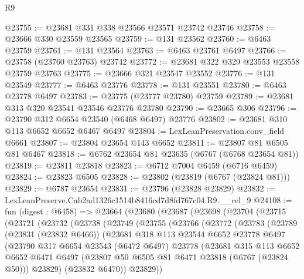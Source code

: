 \begin{lexlean}{R9}
\begin{coremodule}
@23755 := @23681 @331 @338 @23566 @23571 @23742 @23746
@23758 := @23666 @330 @23559 @23565
@23759 := @131 @23562
@23760 := @6463 @23759
@23761 := @131 @23564
@23763 := @6463 @23761 @6497
@23766 := @23758 (@23760 @23763) @23742
@23772 := @23681 @322 @329 @23553 @23558 @23759 @23763
@23775 := @23666 @321 @23547 @23552
@23776 := @131 @23549
@23777 := @6463 @23776
@23778 := @131 @23551
@23780 := @6463 @23778 @6497
@23783 := @23775 (@23777 @23780) @23759
@23789 := @23681 @313 @320 @23541 @23546 @23776 @23780
@23790 := @23665 @306
@23796 := @23790 @312 @6654 @23540 (@6468 @6497) @23776
@23802 := @23681 @310 @113 @6652 @6652 @6467 @6497
@23804 := LexLeanPreservation.conv_field @6661
@23807 := @23804 @23654 @143 @6652
@23811 := @23807 @81 @6505 @81 @6467
@23818 := @6762 @23654 @81 @23635 (@6767 (@6768 @23654 @81))
@23819 := @23811 @23818
@23823 := @6712 @7004 @6459 (@6716 @6459)
@23824 := @23823 @6505
@23828 := @23802 (@23819 (@6767 (@23824 @81)))
@23829 := @6787 @23654
@23831 := @23796 (@23828 @23829)
@23832 := LexLeanPreserve.Cab2ad1326c1514b8416cd7d8fd767c04.R9.__rel_9
@24108 := fun (digest : @6458) =>
  @23664
    (@23680
      (@23687
        (@23698
          (@23704
            (@23715
              (@23721
                (@23732
                  (@23738
                    (@23749
                      (@23755
                        (@23766
                          (@23772
                            (@23783
                              (@23789
                                (@23831 (@23832 @6466))
                                (@23681
                                  @318
                                  @113
                                  @23544
                                  @6652
                                  @23778
                                  @6497
                                  (@23790
                                    @317
                                    @6654
                                    @23543
                                    (@6472 @6497)
                                    @23778
                                    (@23681
                                      @315
                                      @113
                                      @6652
                                      @6652
                                      @6471
                                      @6497
                                      (@23807 @50 @6505 @81 @6471 @23818 (@6767 (@23824 @50)))
                                      @23829)
                                    (@23832 @6470))
                                  @23829))

\end{coremodule}
\end{lexlean}
